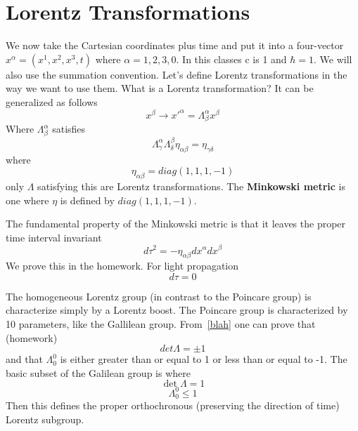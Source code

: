 \section{Lorentz Transformations}
We now take the Cartesian coordinates plus time and put it into a
four-vector $x^\alpha = (x^1, x^2, x^3, t)$ where 
$\alpha = 1, 2, 3, 0$. In this classes c is 1 and $\hbar=1$. We will
also use the summation convention. Let's define Lorentz
transformations in the way we want to use them. What is a Lorentz
transformation? It can be generalized as follows
\begin{equation}
x^\beta \rightarrow x'^\alpha = \Lambda^\alpha _\beta x^\beta
\end{equation}
Where $\Lambda^\alpha_\beta$ satisfies
\begin{equation}\label{blah}
\Lambda^\alpha_\gamma \Lambda^\beta_\delta \eta_{\alpha \beta} =
\eta_{\gamma \delta}
\end{equation}
where
\begin{equation}
\eta_{\alpha \beta} = diag(1, 1, 1, -1)
\end{equation}
only $\Lambda$ satisfying this are Lorentz transformations. The
\textbf{Minkowski metric} is one where $\eta$ is defined by $diag(1,
1, 1, -1)$.

The fundamental property of the Minkowski metric is that it leaves the
proper time interval invariant
\begin{equation}
d\tau^2 = -\eta_{\alpha\beta} dx^\alpha dx^\beta
\end{equation}
We prove this in the homework. For light propagation
\begin{equation}
d\tau = 0
\end{equation}

The homogeneous Lorentz group (in contrast to the Poincare group) is
characterize simply by a Lorentz boost. The Poincare group is
characterized by 10 parameters, like the Gallilean
group. From~\ref{blah} one can prove that (homework)
\begin{equation}
det \Lambda = \pm 1
\end{equation}
and that $\Lambda_0^0$ is either greater than or equal to 1 or less
than or equal to -1. The basic subset of the Galilean group is where
\begin{equation}
\det \Lambda = 1
\end{equation}
\begin{equation}
\Lambda^0_0 \le 1
\end{equation}
Then this defines the proper orthochronous (preserving the direction
of time) Lorentz subgroup.

